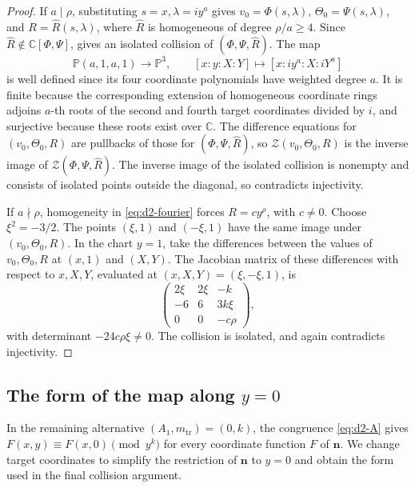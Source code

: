 \documentclass[11pt,letterpaper]{article}
\numberwithin{equation}{section}
\theoremstyle{remark}
\theoremstyle{plain}
\newcommand{\C}{\mathbb{C}}
\begin{document}
\begin{proof}
If $a\mid\rho$, substituting $s=x,\lambda=iy^a$ gives
$v_0=\Phi(s,\lambda)$, $\Theta_0=\Psi(s,\lambda)$, and
$R=\widehat R(s,\lambda)$, where $\widehat R$ is homogeneous
of degree $\rho/a\geq4$.
Since $\widehat R\notin\C[\Phi,\Psi]$,
 gives an isolated collision
of $(\Phi,\Psi,\widehat R)$.
The map
\[
 \mathbb P(a,1,a,1)\longrightarrow\mathbb P^3,\qquad
 [x:y:X:Y]\longmapsto[x:iy^a:X:iY^a]
\]
is well defined since its four coordinate polynomials have weighted degree $a$.
It is finite because the corresponding extension of homogeneous coordinate rings
adjoins $a$-th roots of the second and fourth target coordinates divided
by $i$, and surjective because these roots exist over $\C$.
The difference equations for
$(v_0,\Theta_0,R)$ are pullbacks of those for $(\Phi,\Psi,\widehat R)$,
so $\mathcal Z(v_0,\Theta_0,R)$ is the inverse image of
$\mathcal Z(\Phi,\Psi,\widehat R)$.
The inverse image of the isolated collision is nonempty and consists
of isolated points outside the diagonal, so
 contradicts injectivity.

If $a\nmid\rho$, homogeneity in \eqref{eq:d2-fourier} forces
$R=cy^\rho$, with $c\neq0$.  Choose $\xi^2=-3/2$.
The points $(\xi,1)$ and $(-\xi,1)$ have the same image under
$(v_0,\Theta_0,R)$.  In the chart $y=1$, take the differences
between the values of $v_0,\Theta_0,R$ at $(x,1)$ and $(X,Y)$.
The Jacobian matrix of these differences with respect to $x,X,Y$,
evaluated at $(x,X,Y)=(\xi,-\xi,1)$, is
\[
 \begin{pmatrix}
  2\xi&2\xi&-k\\
  -6&6&3k\xi\\
  0&0&-c\rho
 \end{pmatrix},
\]
with determinant $-24c\rho\xi\neq0$.  The collision is isolated,
and  again contradicts injectivity.
\end{proof}

\subsection{The form of the map along
\texorpdfstring{$y=0$}{y=0}}

In the remaining alternative $(A_1,m_{\mathrm{tr}})=(0,k)$,
the congruence \eqref{eq:d2-A} gives
$F(x,y)\equiv F(x,0)\pmod{y^k}$ for every coordinate function $F$ of $\boldsymbol n$.
We change target coordinates to simplify the restriction of
$\boldsymbol n$ to $y=0$ and obtain the form used in the final collision argument.
\end{document}
